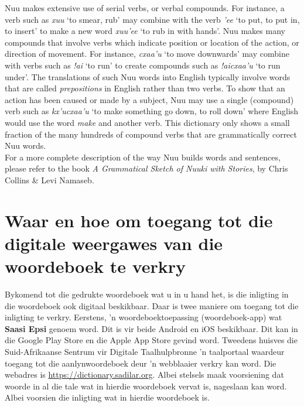 N\textipa{\textvertline}uu makes extensive use of serial verbs, or
verbal compounds. For instance, a verb such as \emph{xuu}
`to smear, rub' may combine with the verb
\emph{\textipa{\textvertline}'ee} `to put, to put in, to insert' to
make a new word \emph{xuu\textipa{\textvertline}'ee} `to
rub in with hands'.  N\textipa{\textvertline}uu makes many compounds
that involve verbs which indicate position or location of the action,
or direction of movement. For instance, \emph{cxaa'u} `to move
downwards' may combine with verbs such as \emph{!ai} `to run' to
create compounds such as \emph{!aicxaa'u} `to run under'. The
translations of such N\textipa{\textvertline}uu words into English
typically involve words that are called \emph{prepositions} in English
rather than two verbs. To show that an action has been caused or made
by a subject, N\textipa{\textvertline}uu may use a single (compound)
verb such as \emph{kx'ucxaa'u} `to make something go down, to roll
down' where English would use the word \emph{make} and another verb. This
dictionary only shows a small fraction of the many hundreds of
compound verbs that are grammatically correct
N\textipa{\textvertline}uu words.\\

For a more complete description of the way N\textipa{\textvertline}uu
builds words and sentences, please refer to the book \emph{A
Grammatical Sketch of N\textipa{\textvertline}uuki with Stories}, by
Chris Collins \& Levi Namaseb.


\markboth{}{}
\section{Waar en hoe om toegang tot die digitale weergawes van die
woordeboek te verkry}
\markboth{}{}

Bykomend tot die gedrukte woordeboek wat u in u hand het, is die
inligting in die woordeboek ook digitaal beskikbaar. Daar is twee
maniere om toegang tot die inligting te verkry. Eerstens, 'n
woordeboektoepassing (woordeboek-app) wat \textbf{Saasi Epsi} genoem
word. Dit is vir beide Android en iOS beskikbaar. Dit kan in die
Google Play Store en die Apple App Store gevind word. Tweedens huisves
die Suid-Afrikaanse Sentrum vir Digitale Taalhulpbronne 'n taalportaal
waardeur toegang tot die aanlynwoordeboek deur 'n webblaaier verkry
kan word. Die webadres is \url{https://dictionary.sadilar.org}. Albei
stelsels maak voorsiening dat woorde in al die tale wat in hierdie
woordeboek vervat is, nageslaan kan word. Albei voorsien die inligting
wat in hierdie woordeboek is.



